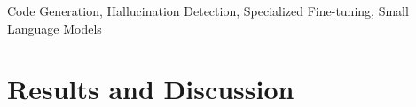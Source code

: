 \documentclass{sbc2019}
\begin{document}
\begin{frontmatter}
\begin{abstract}
\end{abstract}

\begin{keywords}
Code Generation, Hallucination Detection, Specialized Fine-tuning, Small Language Models
\end{keywords}
\end{frontmatter}






\section{Results and Discussion}
\label{sec:results}

\end{document}

